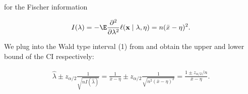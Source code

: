 \begin{solution}
for the Fischer information

\begin{align*}
    I(\lambda)
    =
    -\E \frac{\partial^2}{\partial \lambda^2} \ell(\mathbf x \mid \lambda, \eta)
    =
    n (\bar x - \eta)^2.
\end{align*}

We plug into the Wald type interval (1) from \cite[lecture 9, slide 7]{EStat} and obtain the upper and lower bound of the CI respectively:

\begin{align*}
    \hat \lambda \pm z_{\alpha / 2} \frac{1}{\sqrt{n I(\hat \lambda)}}
    =
    \frac{1}{\bar x - \eta} \pm z_{\alpha / 2} \frac{1}{\sqrt{n^2 (\bar x - \eta)^2}}
    =
    \frac{1 \pm z_{\alpha / 2} / n}{\bar x - \eta}.
\end{align*}

\end{solution}


